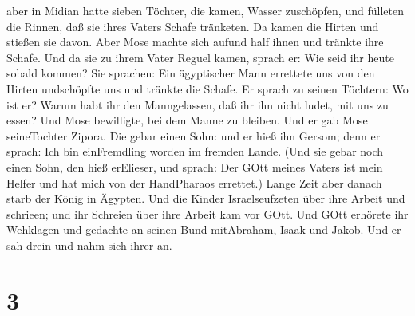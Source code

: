 aber in Midian hatte sieben Töchter, die kamen, Wasser zuschöpfen, und
fülleten die Rinnen, daß sie ihres Vaters Schafe tränketen.
 Da kamen die Hirten und stießen sie davon. Aber Mose
machte sich aufund half ihnen und tränkte ihre Schafe.  Und
da sie zu ihrem Vater Reguel kamen, sprach er: Wie seid ihr heute sobald
kommen?  Sie sprachen: Ein ägyptischer Mann errettete uns
von den Hirten undschöpfte uns und tränkte die Schafe.  Er
sprach zu seinen Töchtern: Wo ist er? Warum habt ihr den Manngelassen,
daß ihr ihn nicht ludet, mit uns zu essen?  Und Mose
bewilligte, bei dem Manne zu bleiben. Und er gab Mose seineTochter
Zipora.  Die gebar einen Sohn: und er hieß ihn Gersom; denn
er sprach: Ich bin einFremdling worden im fremden Lande. (Und sie gebar
noch einen Sohn, den hieß erElieser, und sprach: Der GOtt meines Vaters
ist mein Helfer und hat mich von der HandPharaos errettet.)
 Lange Zeit aber danach starb der König in Ägypten. Und die
Kinder Israelseufzeten über ihre Arbeit und schrieen; und ihr Schreien
über ihre Arbeit kam vor GOtt.  Und GOtt erhörete ihr
Wehklagen und gedachte an seinen Bund mitAbraham, Isaak und Jakob.
 Und er sah drein und nahm sich ihrer an.

\hypertarget{section-2}{%
\section{3}\label{section-2}}

